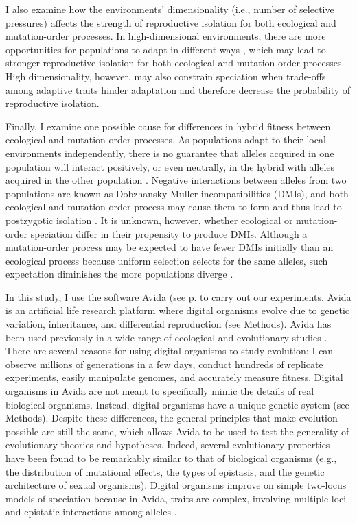 \begin{doublespace}
I also examine how the environments' dimensionality
(i.e., number of selective pressures)
affects the strength of reproductive isolation
for both ecological and mutation-order processes.
%
In high-dimensional environments,
there are more opportunities for populations
to adapt in different ways \citep{ric93,nos09},
which may lead to stronger reproductive isolation
for both ecological and mutation-order processes.
%
High dimensionality, however, may also constrain speciation
when trade-offs among adaptive traits hinder adaptation
and therefore decrease the probability of reproductive isolation.



Finally, I examine one possible cause for differences
in hybrid fitness between ecological and mutation-order processes.
%
As populations adapt to their local environments independently,
there is no guarantee that alleles acquired in one population
will interact positively, or even neutrally, in the hybrid
with alleles acquired in the other population \citep{coy04}.
%
Negative interactions between alleles from two populations
are known as Dob\-zhan\-sky-Mul\-ler incompatibilities (DMIs),
and both ecological and mutation-order process
may cause them to form and thus lead to postzygotic isolation \citep{sch09}.
%
It is unknown, however, whether ecological or mutation-order speciation
differ in their propensity to produce DMIs.
%
Although a mutation-order process may be expected to have
fewer DMIs initially than an ecological process
because uniform selection selects for the same alleles,
such expectation diminishes the more populations diverge \citep{sch09}.



In this study, I use the software Avida (see p. \pageref{sec:avida}
to carry out our experiments.
%
Avida \citep{ofr04} is an artificial life research platform
where digital organisms evolve due to genetic variation, inheritance,
and differential reproduction (see Methods).
%
Avida has been used previously
in a wide range of ecological and evolutionary studies
\citep[e.g.,][]{len03,cho04,ele07,ost07,mis10}.
%
There are several reasons for using digital organisms to study evolution:
I can observe millions of generations in a few days,
conduct hundreds of replicate experiments,
easily manipulate genomes,
and accurately measure fitness.
%
Digital organisms in Avida are not meant to specifically mimic
the details of real biological organisms.
%
Instead, digital organisms have a unique genetic system (see Methods).
%
Despite these differences, the general principles
that make evolution possible are still the same,
which allows Avida to be used to test the generality
of evolutionary theories and hypotheses.
%
Indeed, several evolutionary properties
have been found to be remarkably similar to that of biological organisms
\citep{wil02,ada06}
(e.g., the distribution of mutational effects, the types of epistasis,
and the genetic architecture of sexual organisms).
%
Digital organisms improve on simple two-locus models of speciation
because in Avida, traits are complex,
involving multiple loci and epistatic interactions among alleles \citep{len99}.




\end{doublespace}

